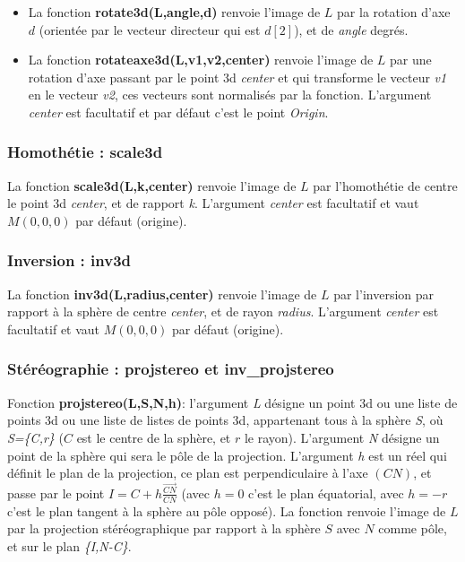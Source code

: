 \begin{itemize}
    \item La fonction \textbf{rotate3d(L,angle,d)} renvoie l'image de $L$ par la rotation d'axe $d$ (orientée par le vecteur directeur qui est $d[2]$), et de \emph{angle} degrés.
    \item La fonction \textbf{rotateaxe3d(L,v1,v2,center)} renvoie l'image de $L$ par une rotation d'axe passant par le point 3d \emph{center} et qui transforme le vecteur \emph{v1} en le vecteur \emph{v2}, ces vecteurs sont normalisés par la fonction. L'argument \emph{center} est facultatif et par défaut c'est le point \emph{Origin}.
\end{itemize}


\subsubsection{Homothétie : scale3d}

La fonction \textbf{scale3d(L,k,center)} renvoie l'image de $L$ par l'homothétie de centre le point 3d \emph{center}, et de rapport \emph{k}. L'argument \emph{center} est facultatif et vaut $M(0,0,0)$ par défaut (origine).

\subsubsection{Inversion : inv3d}

La fonction \textbf{inv3d(L,radius,center)} renvoie l'image de $L$ par l'inversion par rapport à la sphère de centre  \emph{center}, et de rayon \emph{radius}.  L'argument \emph{center} est facultatif et vaut $M(0,0,0)$ par défaut (origine).

\subsubsection{Stéréographie : projstereo et inv\_projstereo}

Fonction \textbf{projstereo(L,S,N,h)}: l'argument \emph{L} désigne un point 3d ou une liste de points 3d ou une liste de listes de points 3d, appartenant tous à la sphère \emph{S}, où \emph{S=\{C,r\}} ($C$ est le centre de la sphère, et $r$ le rayon). L'argument \emph{N} désigne un point de la sphère qui sera le pôle de la projection. L'argument \emph{h} est un réel qui définit le plan de la projection, ce plan est perpendiculaire à l'axe $(CN)$, et passe par le point $I=C+h \frac{\vec{CN}}{CN}$ (avec $h=0$ c'est le plan équatorial, avec $h=-r$ c'est le plan tangent à la sphère au pôle opposé). La fonction renvoie l'image de $L$ par la projection stéréographique par rapport à la sphère $S$ avec $N$ comme pôle, et sur le plan \emph{\{I,N-C\}}.

